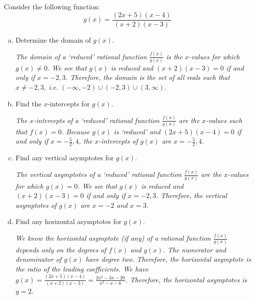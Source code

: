 \documentclass[12pt,letterpaper]{exam}
\begin{document}
\begin{questions}
\newpage
\question[8] Consider the following function:
	\[
	g(x)= \dfrac{(2x + 5)(x - 4)}{(x + 2)(x - 3)}
	\] \par\vspace{0.25cm}

\begin{enumerate}[(a)]
\item Determine the domain of $g(x)$. \vfill

{\itshape The domain of a `reduced' rational function $\frac{f(x)}{g(x)}$ is the $x$-values for which $g(x) \neq 0$. We see that $g(x)$ is reduced and $(x + 2)(x - 3)= 0$ if and only if $x= -2, 3$. Therefore, the domain is the set of all reals such that $x \neq -2, 3$, i.e. $(-\infty, -2) \cup (-2, 3) \cup (3, \infty)$.} \vfill

\item Find the $x$-intercepts for $g(x)$. \vfill

{\itshape The $x$-intercepts of a `reduced' rational function $\frac{f(x)}{g(x)}$ are the $x$-values such that $f(x)= 0$. Because $g(x)$ is `reduced' and $(2x + 5)(x - 4)= 0$ if and only if $x= -\frac{5}{2}, 4$, the $x$-intercepts of $g(x)$ are $x= -\frac{5}{2}, 4$.} \vfill

\item Find any vertical asymptotes for $g(x)$. \vfill

{\itshape The vertical asymptotes of a `reduced' rational function $\frac{f(x)}{g(x)}$ are the $x$-values for which $g(x)= 0$. We see that $g(x)$ is reduced and $(x + 2)(x - 3)= 0$ if and only if $x= -2, 3$. Therefore, the vertical asymptotes of $g(x)$ are $x= -2$ and $x= 3$.} \vfill

\item Find any horizontal asymptotes for $g(x)$. \vfill

{\itshape We know the horizontal asymptote (if any) of a rational function $\frac{f(x)}{g(x)}$ depends only on the degrees of $f(x)$ and $g(x)$. The numerator and denominator of $g(x)$ have degree two. Therefore, the horizontal asymptote is the ratio of the leading coefficients. We have $g(x)= \frac{(2x + 5)(x - 4)}{(x + 2)(x - 3)}= \frac{2x^2 - 3x - 20}{x^2 - x - 6}$. Therefore, the horizontal asymptotes is $y= 2$.} \vfill
\end{enumerate}


\end{questions}
\end{document}
